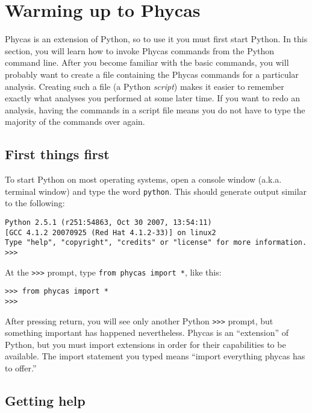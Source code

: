 \documentclass[10pt]{article}
\newcommand{\code}[1]{{\tt #1}}				%
\begin{document}
\section{Warming up to Phycas} \label{sec:warmup}

Phycas is an extension of Python, so to use it you must first start Python. In this section, you will learn how to invoke Phycas commands from the Python command line. After you become familiar with the basic commands, you will probably want to create a file containing the Phycas commands for a particular analysis. Creating such a file (a Python {\em script}) makes it easier to remember exactly what analyses you performed at some later time. If you want to redo an analysis, having the commands in a script file means you do not have to type the majority of the commands over again.

\subsection{First things first}

To start Python on most operating systems, open a console window (a.k.a. terminal window) and type the word \code{python}. This should generate output similar to the following:
\begin{verbatim}
Python 2.5.1 (r251:54863, Oct 30 2007, 13:54:11) 
[GCC 4.1.2 20070925 (Red Hat 4.1.2-33)] on linux2
Type "help", "copyright", "credits" or "license" for more information.
>>> 
\end{verbatim}

At the \code{>>>} prompt, type \code{from phycas import *}, like this:
\begin{verbatim}
>>> from phycas import *
>>>
\end{verbatim}

After pressing return, you will see only another Python \code{>>>} prompt, but something important has happened nevertheless. Phycas is an ``extension'' of Python, but you must import extensions in order for their capabilities to be available. The import statement you typed means ``import everything phycas has to offer.'' 

\subsection{Getting help}
\end{document}
